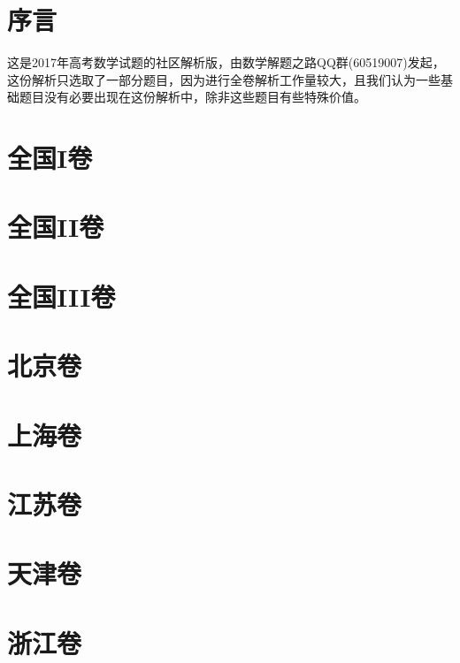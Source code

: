 \documentclass{ctexart}
\title{\kaishu{2017年高考数学试题选析}}
\author{数学解题之路QQ群(60519007)}
\date{更新于: \today}
\begin{document}
\maketitle

\tableofcontents

\section{序言}
\label{sec:preface}

这是2017年高考数学试题的社区解析版，由数学解题之路QQ群(60519007)发起，这份解析只选取了一部分题目，因为进行全卷解析工作量较大，且我们认为一些基础题目没有必要出现在这份解析中，除非这些题目有些特殊价值。

\section{全国I卷}
\label{sec:nation-1}

\section{全国II卷}
\label{sec:nation-2}

\section{全国III卷}
\label{sec:nation-3}

\section{北京卷}
\label{sec:beijing}

\section{上海卷}
\label{sec:shanghai}

\section{江苏卷}
\label{sec:jiangshu}

\section{天津卷}
\label{sec:tianjin}

\section{浙江卷}
\label{sec:zhejiang}
\end{document}
